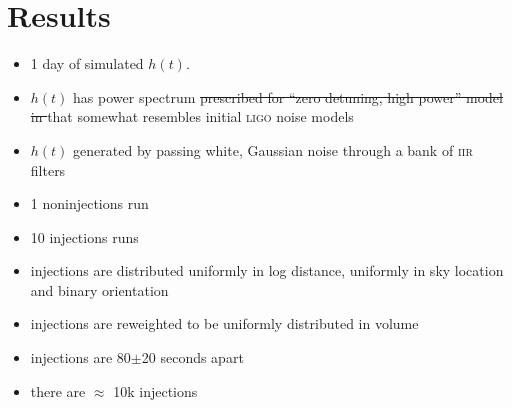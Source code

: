 \section{Results}
\label{SECIV}\label{sec:results}

\begin{itemize}
\item 1 day of simulated $h(t)$.
\item $h(t)$ has power spectrum \sout{prescribed for ``zero detuning, high power'' model in \cite{Shoemaker:2009p9770}} that somewhat resembles initial \textsc{ligo} noise models
\item $h(t)$ generated by passing white, Gaussian noise through a bank of \textsc{iir} filters
\item 1 noninjections run
\item 10 injections runs
\item injections are distributed uniformly in log distance, uniformly in sky location and binary orientation
\item injections are reweighted to be uniformly distributed in volume
\item injections are 80$\pm$20 seconds apart
\item there are $\approx$ 10k injections
\end{itemize}

